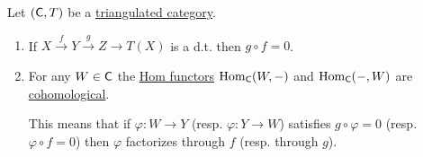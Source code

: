 \documentclass[../../main]{subfiles}
\begin{document}
\begin{proposition}\label{prop:dt-and-hom}
  Let \((\mathsf{C}, T)\) be a \hyperref[def:triangulated-category]{triangulated category}.
  \begin{enumerate}
    \item If \(X \xrightarrow{f} Y \xrightarrow{g} Z \to T(X)\) is a d.t. then \(g \circ f = 0\).
    \item For any \(W \in \mathsf{C}\) the \hyperref[ex:hom-functor]{Hom functors} \(\operatorname{Hom}_{\mathsf{C}}(W, -)\) and \(\operatorname{Hom}_{\mathsf{C}}(-, W)\) are \hyperref[def:cohomological-functor]{cohomological}.

          This means that if \(\varphi: W \to Y\) (resp. \(\varphi: Y \to W\)) satisfies \(g \circ \varphi = 0\) (resp. \(\varphi \circ f = 0\)) then \(\varphi\) factorizes through \(f\) (resp. through \(g\)).
  \end{enumerate}
\end{proposition}
\end{document}
